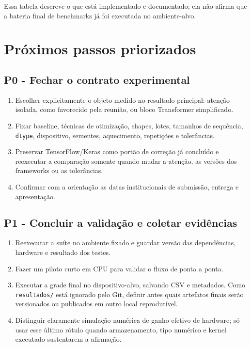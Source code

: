 Essa tabela descreve o que está implementado e documentado; ela não afirma que a bateria final de benchmarks já foi executada no ambiente-alvo.



\section{Próximos passos priorizados}



\subsection{P0 - Fechar o contrato experimental}


\begin{enumerate}
\item Escolher explicitamente o objeto medido no resultado principal: atenção
isolada, como favorecido pela reunião, ou bloco Transformer simplificado.
\item Fixar baseline, técnicas de otimização, shapes, lotes, tamanhos de sequência,
\texttt{dtype}, dispositivo, sementes, aquecimento, repetições e tolerâncias.
\item Preservar TensorFlow/Keras como portão de correção já concluído e reexecutar a
comparação somente quando mudar a atenção, as versões dos frameworks ou as
tolerâncias.
\item Confirmar com a orientação as datas institucionais de submissão, entrega e
apresentação.
\end{enumerate}


\subsection{P1 - Concluir a validação e coletar evidências}


\begin{enumerate}
\item Reexecutar a suíte no ambiente fixado e guardar versão das dependências,
hardware e resultado dos testes.
\item Fazer um piloto curto em CPU para validar o fluxo de ponta a ponta.
\item Executar a grade final no dispositivo-alvo, salvando CSV e metadados. Como
\texttt{resultados/\allowbreak{}} está ignorado pelo Git, definir antes quais artefatos finais
serão versionados ou publicados em outro local reprodutível.
\item Distinguir claramente simulação numérica de ganho efetivo de hardware; só usar
esse último rótulo quando armazenamento, tipo numérico e kernel executado
sustentarem a afirmação.
\end{enumerate}


